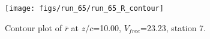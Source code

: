 \begin{figure}[H]
\centering
\texttt{[image: figs/run\_65/run\_65\_R\_contour]}
\caption{Contour plot of $\overline{r}$ at $z/c$=10.00, $V_{free}$=23.23, station 7.}
\end{figure}


